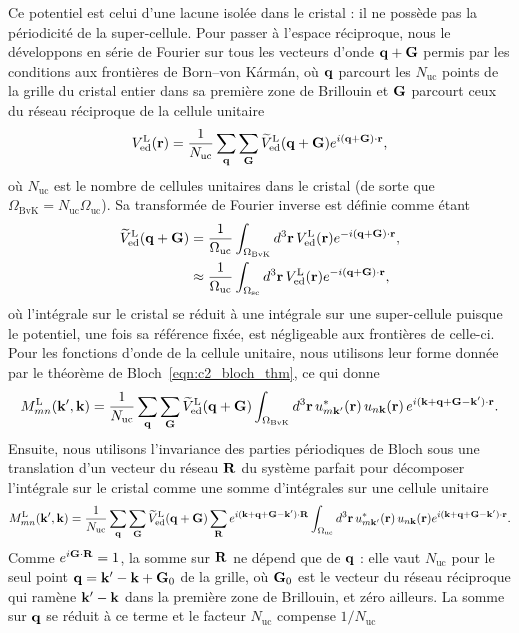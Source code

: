 Ce potentiel est celui d'une lacune isolée dans le cristal : il ne possède pas la périodicité de la super-cellule. Pour passer à l'espace réciproque, nous le développons en série de Fourier sur tous les vecteurs d'onde $\mathbf{q}+\mathbf{G}$ permis par les conditions aux frontières de Born--von Kármán, où $\mathbf{q}$ parcourt les $N_\text{uc}$ points de la grille du cristal entier dans sa première zone de Brillouin et $\mathbf{G}$ parcourt ceux du réseau réciproque de la cellule unitaire
\begin{equation}
    V_\text{ed}^\text{L}(\mathbf{r}) = \frac{1}{N_\text{uc}}\sum_{\mathbf{q}}\sum_{\mathbf{G}}\widetilde{V}_\text{ed}^\text{L}(\mathbf{q}+\mathbf{G})e^{i(\mathbf{q}+\mathbf{G})\cdot\mathbf{r}},
\end{equation}
où $N_\text{uc}$ est le nombre de cellules unitaires dans le cristal (de sorte que $\Omega_\text{BvK}=N_\text{uc}\Omega_\text{uc}$). Sa transformée de Fourier inverse est définie comme étant
\begin{align}
    \widetilde{V}_\text{ed}^\text{L}(\mathbf{q}+\mathbf{G}) &= \frac{1}{\Omega_\text{uc}}\int_{\Omega_\text{BvK}}d^3\mathbf{r}\,V_\text{ed}^\text{L}(\mathbf{r})e^{-i(\mathbf{q}+\mathbf{G})\cdot\mathbf{r}},\\
    &\approx \frac{1}{\Omega_\text{uc}}\int_{\Omega_\text{sc}}d^3\mathbf{r}\,V_\text{ed}^\text{L}(\mathbf{r})e^{-i(\mathbf{q}+\mathbf{G})\cdot\mathbf{r}},
\end{align}
où l'intégrale sur le cristal se réduit à une intégrale sur une super-cellule puisque le potentiel, une fois sa référence fixée, est négligeable aux frontières de celle-ci. Pour les fonctions d'onde de la cellule unitaire, nous utilisons leur forme donnée par le théorème de Bloch~\eqref{eqn:c2_bloch_thm}, ce qui donne
\begin{equation}
    M^\text{L}_{mn}(\mathbf{k}',\mathbf{k}) = \frac{1}{N_\text{uc}}\sum_{\mathbf{q}}\sum_{\mathbf{G}}\widetilde{V}_\text{ed}^\text{L}(\mathbf{q}+\mathbf{G})\int_{\Omega_\text{BvK}}d^3\mathbf{r}\,u^*_{m\mathbf{k}'}(\mathbf{r})\,u_{n\mathbf{k}}(\mathbf{r})\,e^{i(\mathbf{k}+\mathbf{q}+\mathbf{G}-\mathbf{k}')\cdot\mathbf{r}}.
\end{equation}
Ensuite, nous utilisons l'invariance des parties périodiques de Bloch sous une translation d'un vecteur du réseau $\mathbf{R}$ du système parfait pour décomposer l'intégrale sur le cristal comme une somme d'intégrales sur une cellule unitaire
\begin{equation}
    M^\text{L}_{mn}(\mathbf{k}',\mathbf{k}) = \frac{1}{N_\text{uc}}\sum_{\mathbf{q}}\sum_{\mathbf{G}}\widetilde{V}_\text{ed}^\text{L}(\mathbf{q}+\mathbf{G})\sum_{\mathbf{R}} e^{i(\mathbf{k}+\mathbf{q}+\mathbf{G}-\mathbf{k}')\cdot\mathbf{R}}\int_{\Omega_\text{uc}} d^3\mathbf{r}\,u_{m\mathbf{k}'}^*(\mathbf{r})\,u_{n\mathbf{k}}(\mathbf{r})e^{i(\mathbf{k}+\mathbf{q}+\mathbf{G}-\mathbf{k}')\cdot\mathbf{r}}.
\end{equation}
Comme $e^{i\mathbf{G}\cdot\mathbf{R}}=1$, la somme sur $\mathbf{R}$ ne dépend que de $\mathbf{q}$ : elle vaut $N_\text{uc}$ pour le seul point $\mathbf{q}=\mathbf{k}'-\mathbf{k}+\mathbf{G}_0$ de la grille, où $\mathbf{G}_0$ est le vecteur du réseau réciproque qui ramène $\mathbf{k}'-\mathbf{k}$ dans la première zone de Brillouin, et zéro ailleurs. La somme sur $\mathbf{q}$ se réduit à ce terme et le facteur $N_\text{uc}$ compense $1/N_\text{uc}$
